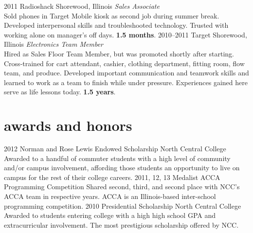\documentclass[]{friggeri-cv} %
\begin{document}
\begin{entrylist}
\entry
{2011}
{Radioshack}
{Shorewood, Illinois}
{\emph{Sales Associate} \\
Sold phones in Target Mobile kiosk as second job during summer break.
Developed interpersonal skills and troubleshooted technology.
Trusted with working alone on manager's off days. \textbf{1.5 months}.}
\entry
{2010--2011}
{Target}
{Shorewood, Illinois}
{\emph{Electronics Team Member} \\
Hired as Sales Floor Team Member, but was promoted shortly after starting. Cross-trained for cart attendant, cashier, clothing department, fitting room, flow team, and produce.
Developed important communication and teamwork skills and learned to work as a team to finish while under pressure.
Experiences gained here serve as life lessons today. \textbf{1.5 years}.}
\end{entrylist}


\section{awards and honors}

\begin{entrylist}
\entry
{2012}
{Norman and Rose Lewis Endowed Scholarship}
{North Central College}
{Awarded to a handful of commuter students with a high level of community and/or campus involvement, affording those students an opportunity to live on campus for the rest of their college careers.}
\entry
{2011, 12, 13}
{Medalist}
{ACCA Programming Competition}
{Shared second, third, and second place with NCC's ACCA team in respective years.
ACCA is an Illinois-based inter-school programming competition.}
\entry
{2010}
{Presidential Scholarship}
{North Central College}
{Awarded to students entering college with a high high
school GPA and extracurricular involvement.
The most prestigious scholarship offered by NCC.}

\end{entrylist}
\end{document}
